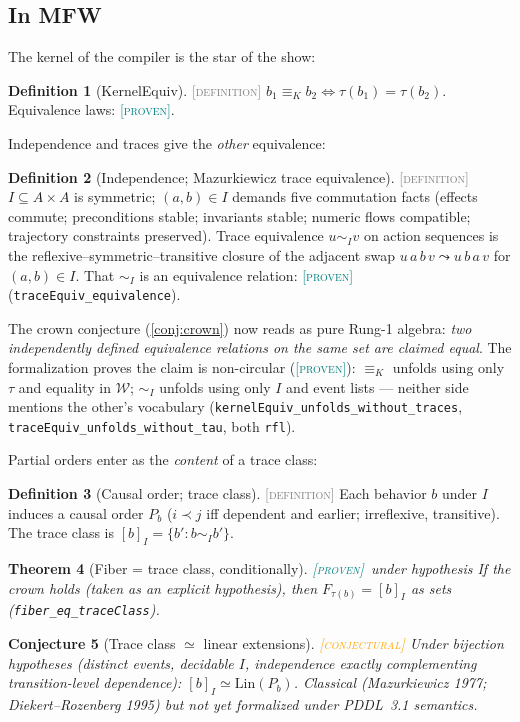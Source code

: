 \documentclass[11pt]{article}
\newcommand{\PROVEN}{\textcolor{teal}{\textsc{[proven]}}}
\newcommand{\DEFINITION}{\textcolor{gray}{\textsc{[definition]}}}
\newcommand{\CONJECTURAL}{\textcolor{orange}{\textsc{[conjectural]}}}
\newcommand{\WS}{\mathcal{W}}
\newcommand{\fib}[1]{F_{#1}}
\newcommand{\kerEq}{\equiv_{K}}
\newcommand{\Lin}{\mathrm{Lin}}
\theoremstyle{plain}
\newtheorem{theorem}{Theorem}[section]
\newtheorem{conjecture}[theorem]{Conjecture}
\theoremstyle{definition}
\newtheorem{definition}[theorem]{Definition}
\theoremstyle{remark}
\begin{document}
\subsection{In MFW}
The kernel of the compiler is the star of the show:
\begin{definition}[KernelEquiv]\DEFINITION\;
$b_1 \kerEq b_2 \iff \tau(b_1) = \tau(b_2)$. Equivalence laws: \PROVEN.
\end{definition}

Independence and traces give the \emph{other} equivalence:
\begin{definition}[Independence; Mazurkiewicz trace equivalence]\DEFINITION\;
$I \subseteq A \times A$ is symmetric; $(a,b) \in I$ demands five
commutation facts (effects commute; preconditions stable; invariants
stable; numeric flows compatible; trajectory constraints preserved).
Trace equivalence $u \sim_I v$ on action sequences is the
reflexive--symmetric--transitive closure of the adjacent swap
$u\,a\,b\,v \leadsto u\,b\,a\,v$ for $(a,b) \in I$. That $\sim_I$ is an
equivalence relation: \PROVEN{} (\texttt{traceEquiv\_equivalence}).
\end{definition}

The crown conjecture (\ref{conj:crown}) now reads as pure Rung-1 algebra:
\emph{two independently defined equivalence relations on the same set are
claimed equal}. The formalization proves the claim is non-circular
(\PROVEN): $\kerEq$ unfolds using only $\tau$ and equality in $\WS$;
$\sim_I$ unfolds using only $I$ and event lists --- neither side mentions
the other's vocabulary (\texttt{kernelEquiv\_unfolds\_without\_traces},
\texttt{traceEquiv\_unfolds\_without\_tau}, both \texttt{rfl}).

Partial orders enter as the \emph{content} of a trace class:
\begin{definition}[Causal order; trace class]\DEFINITION\;
Each behavior $b$ under $I$ induces a causal order $P_b$ ($i \prec j$ iff
dependent and earlier; irreflexive, transitive). The trace class is
$[b]_I = \{b' : b \sim_I b'\}$.
\end{definition}

\begin{theorem}[Fiber = trace class, conditionally]\PROVEN\ under hypothesis\;
If the crown holds (taken as an explicit hypothesis), then
$\fib{\tau(b)} = [b]_I$ as sets (\texttt{fiber\_eq\_traceClass}).
\end{theorem}

\begin{conjecture}[Trace class $\simeq$ linear extensions]\CONJECTURAL\;
Under bijection hypotheses (distinct events, decidable $I$, independence
exactly complementing transition-level dependence):
$[b]_I \simeq \Lin(P_b)$. Classical (Mazurkiewicz 1977; Diekert--Rozenberg
1995) but not yet formalized under PDDL~3.1 semantics.
\end{conjecture}
\end{document}

